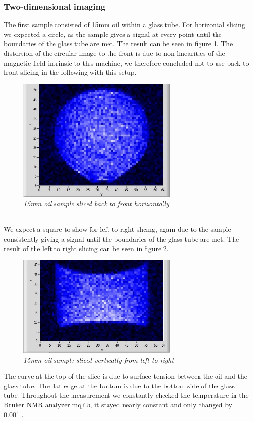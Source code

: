 \subsubsection{Two-dimensional imaging}
The first sample consisted of 15mm oil within a glass tube. For horizontal slicing we expected a circle, as the sample gives a signal at every point until the boundaries of the glass tube are met. The result can be seen in figure \ref{fig:14}. The distortion of the circular image to the front is due to non-linearities of the magnetic field intrinsic to this machine, we therefore concluded not to use back to front slicing in the following with this setup.
\begin{figure}[h]
\includegraphics[width=80mm]{OilCircle}
\centering
\caption{\itshape 15mm oil sample sliced back to front horizontally}
\label{fig:14}
\end{figure}
\noindent
\\
We expect a square to show for left to right slicing, again due to the sample consistently giving a signal until the boundaries of the glass tube are met.
The result of the left to right slicing can be seen in figure \ref{fig:15}.
\begin{figure}[h]
	\includegraphics[width=80mm]{OilSlice}
	\centering
	\caption{\itshape 15mm oil sample sliced vertically from left to right }
	\label{fig:15}
\end{figure}  
\noindent
The curve at the top of the slice is due to surface tension  between the oil and the glass tube. The flat edge at the bottom is due to the bottom side of the glass tube.
Throughout the measurement we constantly checked the temperature in the Bruker NMR analyzer mq7.5, it stayed nearly constant and only changed by 0.001 \textcelsius.\\
\label{sec:4}

